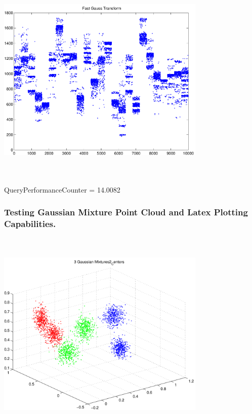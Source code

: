 \documentclass[9pt]{article}
\theoremstyle{plain}
\theoremstyle{definition}
\theoremstyle{remark}
\numberwithin{equation}{section}
\begin{document}
\includegraphics[width=10.0cm,height=10.0cm]{FGT25_Centers.pdf}

QueryPerformanceCounter  =  14.0082
\subsubsection{Testing Gaussian Mixture Point Cloud and Latex Plotting Capabilities.}
\includegraphics[width=10.0cm,height=10.0cm]{GaussianMixture_Dim_3_Centers2.pdf}
\end{document}

